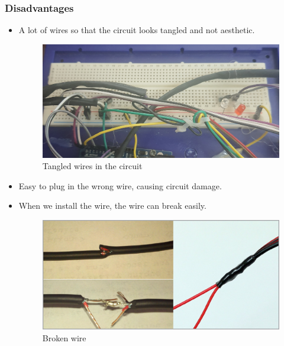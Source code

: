 \documentclass[12pt]{article}
\begin{document}
        \subsubsection{Disadvantages}
            \begin{itemize}
                \item A lot of wires so that the circuit looks tangled and not aesthetic.
                    \begin{figure}[!h]
                           \centering
                            \includegraphics[width=14cm]{images/day_roi.jpg}
                            \caption{Tangled wires in the circuit}
                            \label{fig:schematic}
                    \end{figure}
                \item Easy to plug in the wrong wire, causing circuit damage.
                \item When we install the wire, the wire can break easily.
                    \begin{figure}[!h]
                           \centering
                            \includegraphics[width=14cm]{images/daydien.png}
                            \caption{Broken wire}
                            \label{fig:schematic}
                    \end{figure}
            \end{itemize}
\end{document}
